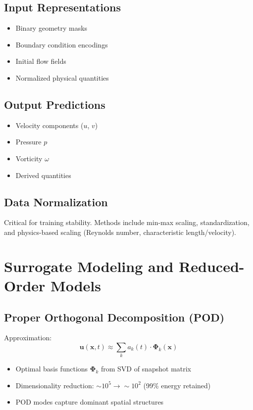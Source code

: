 \subsection{Input Representations}
\begin{itemize}
    \item Binary geometry masks
    \item Boundary condition encodings
    \item Initial flow fields
    \item Normalized physical quantities
\end{itemize}

\subsection{Output Predictions}
\begin{itemize}
    \item Velocity components ($u$, $v$)
    \item Pressure $p$
    \item Vorticity $\omega$
    \item Derived quantities
\end{itemize}

\subsection{Data Normalization}
Critical for training stability. Methods include min-max scaling, standardization, and physics-based scaling (Reynolds number, characteristic length/velocity).

\section{Surrogate Modeling and Reduced-Order Models}

\subsection{Proper Orthogonal Decomposition (POD)}
Approximation:
\begin{equation}
\mathbf{u}(\mathbf{x},t) \approx \sum_{k} a_k(t) \cdot \boldsymbol{\Phi}_k(\mathbf{x})
\end{equation}

\begin{itemize}
    \item Optimal basis functions $\boldsymbol{\Phi}_k$ from SVD of snapshot matrix
    \item Dimensionality reduction: $\sim 10^5 \rightarrow \sim 10^2$ (99\% energy retained)
    \item POD modes capture dominant spatial structures
\end{itemize}

